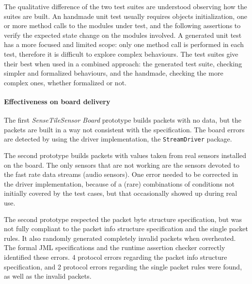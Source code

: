 \documentclass[english]{lni}
\newcommand{\lil}[1]{\texttt{\lstinline|#1|}}
\newcommand{\ST}{\emph{SenseTile}\xspace}
\newcommand{\SB}{\emph{Sensor Board}\xspace}
\newcommand{\STSB}{\ST \SB\xspace}
\begin{document}
The qualitative difference of the two test suites are understood observing how the suites are built. 
An handmade unit test usually requires objects initialization, one or more method calls to the modules under test, and the following assertions to verify the expected state change on the modules involved. 
A generated unit test has a more focused and limited scope: only one method call is performed in each test, therefore it is difficult to explore complex behaviours. 
The test suites give their best when used in a combined approach: the generated test suite, checking simpler and formalized behaviours, and the handmade, checking the more complex ones, whether formalized or not.  



\paragraph*{Effectiveness on board delivery}

The first \STSB prototype builds packets with no data, but the packets are built in a way not consistent with the specification.  
The board errors are detected by using the driver implementation, the \lil{StreamDriver} package.

The second prototype builds packets with values taken from real sensors installed on the board.  
The only sensors that are not working are the sensors devoted to the fast rate data streams (audio sensors).  
One error needed to be corrected in the driver implementation, because of a (rare) combinations of conditions not initially covered by the test cases, but that occasionally showed up during real use.

The second prototype respected the packet byte structure specification, but was not fully compliant to the packet info structure specification and the single packet rules.
It also randomly generated completely invalid packets when overheated.
The formal JML specifications and the runtime assertion checker correctly identified these errors.
4 protocol errors regarding the packet info structure specification, and 2 protocol errors regarding the single packet rules were found, as well as the invalid packets. 
\end{document}
